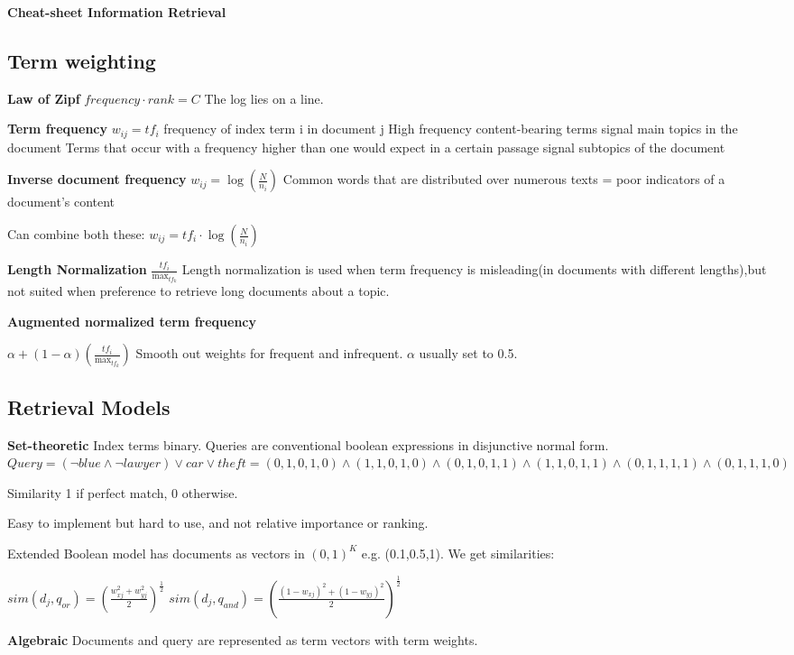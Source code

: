 \documentclass[a4paper,10pt,landscape]{article}
\newcommand{\topic}[1]{\begin{center}\section*{#1}\end{center}}
\begin{document}
\begin{center}
     \Large{\textbf{Cheat-sheet Information Retrieval}} \\
\end{center}
\begin{multicols}{3}

\begin{center}
\topic{Term weighting}

\textbf{Law of Zipf}
$frequency\cdot rank = C$
The log lies on a line.

\textbf{Term frequency}
$w_{ij}=tf_i$ frequency of index term i in document j
High frequency content-bearing terms signal main topics in the document 
Terms that occur with a frequency higher than one would expect in a certain passage signal subtopics of the document

\textbf{Inverse document frequency}
$w_{ij} = \log(\frac{N}{n_i})$
Common words that are distributed over numerous texts = poor indicators of a document’s content

Can combine both these: $w_{ij} = tf_i\cdot \log(\frac{N}{n_i})$

\textbf{Length Normalization}
$\frac{tf_i}{\max_{tf_k}}$
Length normalization is used when term frequency is misleading(in documents with different lengths),but not suited when preference to retrieve long documents about a topic.

\textbf{Augmented normalized term frequency}

$\alpha + (1-\alpha)(\frac{tf_i}{\max_{tf_k}})$
Smooth out weights for frequent and infrequent. $\alpha$ usually set to 0.5.

\topic{Retrieval Models}

\textbf{Set-theoretic}
Index terms binary. Queries are conventional boolean expressions in disjunctive normal form.
$Query=  (\neg blue  \land\neg lawyer) \lor car  \lor theft = (0,1,0,1,0) \land(1,1,0,1,0) \land(0,1,0,1,1) \land(1,1,0,1,1) \land(0,1,1,1,1) \land(0,1,1,1,0)$

Similarity 1 if perfect match, 0 otherwise.

Easy to implement but hard to use, and not relative importance or ranking.

Extended Boolean model has documents as vectors in $(0,1)^K$ e.g. (0.1,0.5,1). We get similarities:

$sim(d_j,q_{or})=(\frac{w_{xj}^2+w_{yj}^2}{2})^{\frac{1}{2}}$
$sim(d_j,q_{and})=(\frac{(1-w_{xj})^2+(1-w_{yj})^2}{2})^{\frac{1}{2}} $

\textbf{Algebraic}
Documents and query are represented as term vectors with term weights.


\end{center}
\end{multicols}
\end{document}
